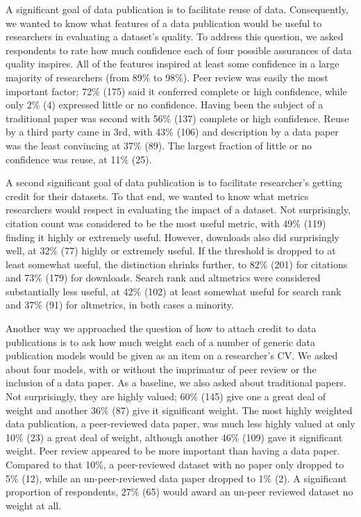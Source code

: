 \documentclass[10pt]{article}
\begin{document}
A significant goal of data publication is to facilitate reuse of data.
Consequently, we wanted to know what features of a data publication would be useful to researchers in evaluating a dataset's quality.
To address this question, we asked respondents to rate how much confidence each of four possible assurances of data quality inspires.
All of the features inspired at least some confidence in a large majority of researchers (from 89\% to 98\%).
Peer review was easily the most important factor; 72\% (175) said it conferred complete or high confidence, while only 2\% (4) expressed little or no confidence.
Having been the subject of a traditional paper was second with 56\% (137) complete or high confidence.
Reuse by a third party came in 3rd, with 43\% (106) and description by a data paper was the least convincing at 37\% (89).
The largest fraction of little or no confidence was reuse, at 11\% (25).

A second significant goal of data publication is to facilitate researcher's getting credit for their datasets.
To that end, we wanted to know what metrics researchers would respect in evaluating the impact of a dataset.
Not surprisingly, citation count was considered to be the most useful metric, with 49\% (119) finding it highly or extremely useful. 
However, downloads also did surprisingly well, at 32\% (77) highly or extremely useful.
If the threshold is dropped to at least somewhat useful, the distinction shrinks further, to 82\% (201) for citations and 73\% (179) for downloads.
Search rank and altmetrics were considered substantially less useful, at 42\% (102) at least somewhat useful for search rank and 37\% (91) for altmetrics, in both cases a minority.

Another way we approached the question of how to attach credit to data publications is to ask how much weight each of a number of generic data publication models would be given as an item on a researcher's CV.
We asked about four models, with or without the imprimatur of peer review or the inclusion of a data paper. 
As a baseline, we also asked about traditional papers.
Not surprisingly, they are highly valued; 60\% (145) give one a great deal of weight and another 36\% (87) give it significant weight.
The most highly weighted data publication, a peer-reviewed data paper, was much less highly valued at only 10\% (23) a great deal of weight, although another 46\% (109) gave it significant weight.
Peer review appeared to be more important than having a data paper. 
Compared to that 10\%, a peer-reviewed dataset with no paper only dropped to 5\% (12), while an un-peer-reviewed data paper dropped to 1\% (2).
A significant proportion of respondents, 27\% (65) would award an un-peer reviewed dataset no weight at all.
\end{document}
